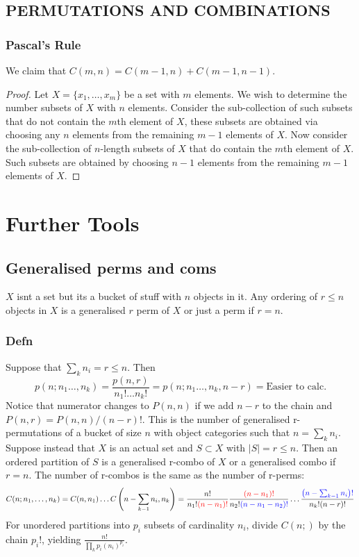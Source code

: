 \documentclass{article}
\begin{document}
\subsection{PERMUTATIONS
AND COMBINATIONS}
\subsubsection*{Pascal's Rule}
We claim that $C(m,n) = C(m-1,n)+C(m-1,n-1)$.
\begin{proof}
Let $X = \{x_1,\hdots,x_m\}$ be a set with $m$ elements.
We wish to determine the number subsets of $X$ with $n$ elements.
Consider the sub-collection of such subsets that
do not contain the $m$th element of $X$,
these subsets are obtained via choosing any $n$ elements
from the remaining $m-1$ elements of $X$. Now consider the sub-collection
of $n$-length subsets of $X$
that do contain the $m$th element of $X$.
Such subsets are obtained by choosing $n-1$ elements from
the remaining $m-1$ elements of $X$.
\end{proof}
\section{Further Tools}
\subsection{Generalised perms and coms}
$X$ isnt a set but its a bucket of stuff with $n$ objects in it.
Any ordering of $r \leq n$ objects in $X$ is a generalised $r$ perm of $X$ or just a perm if $r = n$.
\subsubsection*{Defn}
Suppose that $\sum_k n_i = r \leq n$.  Then
$$
p(n; n_1 \hdots,n_k) =  \frac{p(n,r)}{n_1! \hdots n_k!} = p(n; n_1 \hdots,n_k, n-r) = \text{Easier to calc}.
$$
Notice that numerator changes to $P(n,n)$ if we add $n-r$ to the chain
and $P(n,r) = P(n,n) \slash (n-r)!$. This is the number of generalised r-permutations of a bucket of size $n$ with object categories such that $n = \sum_k n_i$.\\
\newline Suppose instead that $X$ is an actual set and $S \subset X$ with $|S| = r \leq n$.
Then an ordered partition of $S$ is a generalised r-combo of $X$ or a generalised combo if $r = n$.
The number of r-combos is the same as the number of r-perms:
$$C(n;n_1,\hdots,n_k) = C(n,n_1) \hdots C \left(n - \sum_{k-1} n_i,n_k \right) = \frac{n!}{n_1!\color{red}{(n-n_1)!}} \frac{\color{red}{(n-n_1)!}}{n_2!\color{blue}{(n-n_1-n_2)!}} \hdots \frac{\color{red}{\color{blue}{\left(n-\sum_{k-1} n_i \right)!}}}{n_k!(n-r)!}$$
For unordered partitions into $p_i$ subsets of cardinality $n_i$,
divide $C(n;)$ by the chain $p_i!$, yielding $
\frac{n!}{\prod_k p_i(n_i)^{p_i}}.
$
\end{document}
